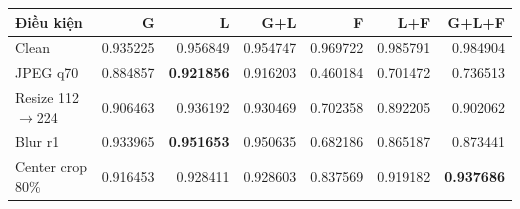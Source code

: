 \scriptsize
\begin{tabular}{lrrrrrr}
\toprule
Điều kiện & G & L & G+L & F & L+F & G+L+F \\
\midrule
Clean & 0.935225 & 0.956849 & 0.954747 & 0.969722 & 0.985791 & 0.984904 \\
JPEG q70 & 0.884857 & \textbf{0.921856} & 0.916203 & 0.460184 & 0.701472 & 0.736513 \\
Resize 112$\to$224 & 0.906463 & 0.936192 & 0.930469 & 0.702358 & 0.892205 & 0.902062 \\
Blur r1 & 0.933965 & \textbf{0.951653} & 0.950635 & 0.682186 & 0.865187 & 0.873441 \\
Center crop 80\% & 0.916453 & 0.928411 & 0.928603 & 0.837569 & 0.919182 & \textbf{0.937686} \\
\bottomrule
\end{tabular}
